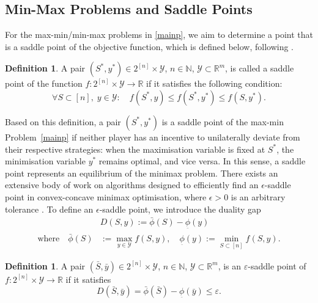 \documentclass{article}
\theoremstyle{plain}
\theoremstyle{definition}
\newtheorem{definition}[theorem]{Definition}
\theoremstyle{remark}
\newcommand{\R}{\mathbb{R}}
\newcommand{\N}{\mathbb{N}}
\begin{document}
\subsection{Min-Max Problems and Saddle Points}
For the max-min/min-max
problems in \eqref{mainp}, %
we aim to
determine a point that is %
a saddle point of the objective function, which is defined below, following \cite{adibi2022minimax}.
\begin{definition}\label{def:saddle}
A pair $(S^{\ast}, y^{\ast})\in 2^{[n]} \times \mathcal{Y}$, $n\in \N$, $\mathcal{Y} \subset \R^m$, is called a saddle point of the function $f: 2^{[n]} \times \mathcal{Y} \rightarrow \R$ if it satisfies the following condition:
\[
\forall S \subset [n], \; y \in \mathcal{Y}: \quad f(S^{\ast}, y) \leq f(S^{\ast}, y^{\ast}) \leq f(S, y^{\ast}).
\]
\end{definition}
Based on this definition, a pair $(S^{\ast}, y^{\ast})$ is a saddle point of the max-min Problem~\eqref{mainp} if neither player has an incentive to unilaterally deviate from their respective strategies: when the maximisation variable is fixed at $S^{\ast}$, the minimisation variable $y^{\ast}$ remains optimal, and vice versa. In this sense, a saddle point represents an equilibrium of the minimax problem.
%
There exists an extensive body of work on algorithms designed to efficiently find an $\epsilon$-saddle point in convex-concave minimax optimisation, where $\epsilon > 0$ is an arbitrary tolerance \cite{thekumparampil2019efficient}. To %
define an $\epsilon$-saddle point, we %
introduce the duality gap %
\begin{align*}
    &D(S, y) := \bar{\phi}(S) - \underset{\bar{}}{\phi}(y) \\
\text{where} \quad \bar{\phi}(S) &:= \max_{y \in \mathcal{Y}} f(S, y), \quad 
\underset{\bar{}}{\phi}(y) := \min_{S \subset [n]} f(S, y).
\end{align*}
\begin{definition}\label{def:eps_saddle}
A pair $(\bar{S}, \bar{y})\in 2^{[n]} \times \mathcal{Y}$, $n\in \N$, $\mathcal{Y} \subset \R^m$, is an $\varepsilon$-saddle point of $f: 2^{[n]} \times \mathcal{Y} \rightarrow \R$ if it satisfies
\[
D(\bar{S}, \bar{y}) = \bar{\phi}(\bar{S}) - \underset{\bar{}}{\phi}(\bar{y}) \le \varepsilon.
\]
\end{definition}
\end{document}
